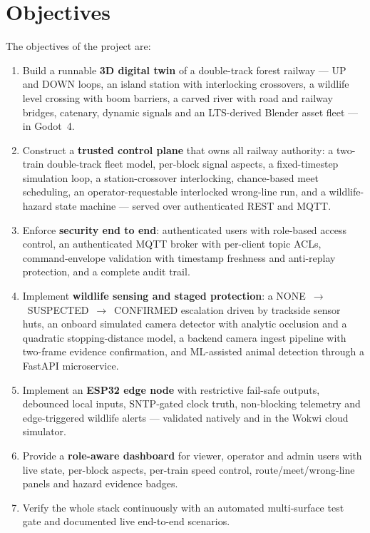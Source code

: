 \section{Objectives}

The objectives of the project are:

\begin{enumerate}
  \item Build a runnable \textbf{3D digital twin} of a double-track forest
        railway --- UP and DOWN loops, an island station with interlocking
        crossovers, a wildlife level crossing with boom barriers, a carved
        river with road and railway bridges, catenary, dynamic signals and
        an LTS-derived Blender asset fleet --- in Godot~4.
  \item Construct a \textbf{trusted control plane} that owns all railway
        authority: a two-train double-track fleet model, per-block signal
        aspects, a fixed-timestep simulation loop, a station-crossover
        interlocking, chance-based meet scheduling, an operator-requestable
        interlocked wrong-line run, and a wildlife-hazard state machine ---
        served over authenticated REST and MQTT.
  \item Enforce \textbf{security end to end}: authenticated users with
        role-based access control, an authenticated MQTT broker with
        per-client topic ACLs, command-envelope validation with
        timestamp freshness and anti-replay protection, and a complete
        audit trail.
  \item Implement \textbf{wildlife sensing and staged protection}: a
        NONE~$\rightarrow$~SUSPECTED~$\rightarrow$~CONFIRMED escalation
        driven by trackside sensor huts, an onboard simulated camera
        detector with analytic occlusion and a quadratic stopping-distance
        model, a backend camera ingest pipeline with two-frame evidence
        confirmation, and ML-assisted animal detection through a FastAPI
        microservice.
  \item Implement an \textbf{ESP32 edge node} with restrictive fail-safe
        outputs, debounced local inputs, SNTP-gated clock truth,
        non-blocking telemetry and edge-triggered wildlife alerts ---
        validated natively and in the Wokwi cloud simulator.
  \item Provide a \textbf{role-aware dashboard} for viewer, operator and
        admin users with live state, per-block aspects, per-train speed
        control, route/meet/wrong-line panels and hazard evidence badges.
  \item Verify the whole stack continuously with an automated
        multi-surface test gate and documented live end-to-end scenarios.
\end{enumerate}

